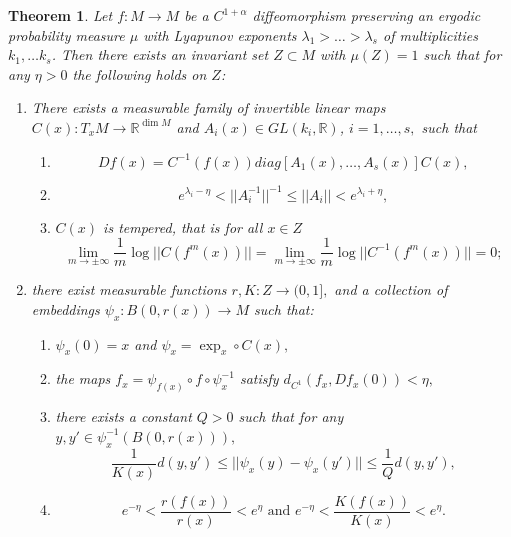 \documentclass{amsart}
\theoremstyle{plain}
\newtheorem{thm}{Theorem}[section]
\theoremstyle{definition}
\theoremstyle{remark}
\numberwithin{equation}{section}
\begin{document}
\begin{thm}\label{thm:Pes}
Let $f : M \to M$ be a $C^{1+\alpha}$ diffeomorphism preserving an ergodic probability measure $\mu$
with Lyapunov exponents $\lambda_1 > \ldots > \lambda_s$ of multiplicities $k_1, \ldots k_s$.
Then there exists an invariant set $Z\subset M$ with $\mu(Z)=1$ such that for any $\eta>0$ the following holds on $Z$:
\begin{enumerate}
\item There exists a measurable family of invertible linear maps $C(x): T_xM \to \mathbb{R}^{\dim M}$ and $A_i(x)\in GL(k_i, \mathbb{R})$, $i=1, \ldots ,s,$ such that

\begin{enumerate}
\item\label{eqn:Oseledecsplit}
$$Df(x)= C^{-1}(f(x)) diag[ A_1(x), \ldots, A_s(x)  ] C(x),$$

\item\label{eqn:norms}
$$  e^{\lambda_i-\eta} < ||A_i^{-1}||^{-1} \leq ||A_i|| < e^{\lambda_i+\eta} ,  $$ 

\item\label{eqn:temp} 
$C(x)$ is tempered, that is for all $x\in Z$ $$  \lim_{m\to \pm \infty  }  \frac{1}{m}   \log ||   C(f^m(x))  ||   =    \lim_{m\to \pm \infty  }  \frac{1}{m}   \log ||   C^{-1}(f^m(x))  ||  =0;      $$
\end{enumerate}

\item there exist measurable functions $r,K: Z \to (0,1],$ and a collection of embeddings $\psi_x:  B(0, r(x)) \to M$ such that:

\begin{enumerate}
\item   $\psi_x(0) = x $ and $\psi_x = \exp_x \circ C(x),$

\item the maps $f_x = \psi_{f(x)}    \circ f   \circ \psi^{-1}_x$ satisfy   $d_{C^1}(f_x, Df_x(0))<\eta,$

\item there exists a constant $Q>0$ such that  for any $y,y'\in   \psi^{-1}_x(B(0,r(x))),$
$$      \frac{1}{K(x)}d(y,y')   \leq    ||  \psi_x(y) -  \psi_x(y')  ||   \leq    \frac{1}{Q}d(y,y')  ,$$

\item  $$  e^{-\eta}  < \frac{r(f(x))}{r(x)} < e^{\eta}  \text{ and } e^{-\eta}  < \frac{K(f(x))}{K(x)} < e^{\eta}  .$$
\end{enumerate}
\end{enumerate}
\end{thm}
\end{document}
